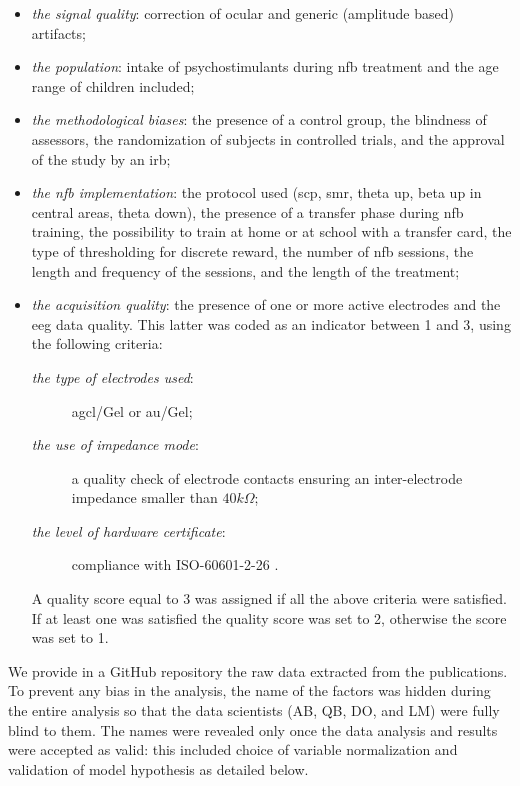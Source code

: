 \begin{itemize}
  \item \emph{the signal quality}: correction of ocular and generic (amplitude based) artifacts;
  \item \emph{the population}: intake of psychostimulants during \gls{nfb} treatment and the age range of children
  included;
  \item \emph{the methodological biases}: the presence of a control group, the blindness of assessors, 
  the randomization of subjects in controlled trials, and the approval of the study by an \gls{irb};
  \item \emph{the \gls{nfb} implementation}: the protocol used (\gls{scp}, \gls{smr}, 
  theta up, beta up in central areas, theta down), the presence of a transfer phase during \gls{nfb} training, the 
	possibility to train at home or at school with a transfer card, 
  the type of thresholding for discrete reward, the number of \gls{nfb} sessions, the length and frequency of the sessions, and the length of
  the treatment;
  \item \emph{the acquisition quality}: the presence of one or more active electrodes and the \gls{eeg} data quality. 
  This latter was coded as an indicator between 1 and 3, using the following criteria:   
	\begin{description}
	  \item[\emph{the type of electrodes used}:] \gls{agcl}/Gel or \gls{au}/Gel;
    \item[\emph{the use of impedance mode}:] a quality check of electrode contacts
		ensuring an inter-electrode impedance smaller than $40k\Omega$;  
    \item[\emph{the level of hardware certificate}:] compliance with ISO-60601-2-26 \citep{ISO-60601-2-26:2012}.
	\end{description}
	A quality score equal to 3 was assigned if all the above criteria were satisfied. If at least one was satisfied
	the quality score was set to 2, otherwise the score was set to 1.
\end{itemize}	

We provide in a GitHub repository \citep{Bussalb2018} the raw data extracted from the publications. To prevent any
bias in the analysis, the name of the factors was hidden during the entire analysis so that the data scientists (AB, QB,
DO, and LM) were fully blind to them. The names were revealed only once the data analysis and results were accepted as valid: 
this included choice of variable normalization and validation of model hypothesis as detailed below.

